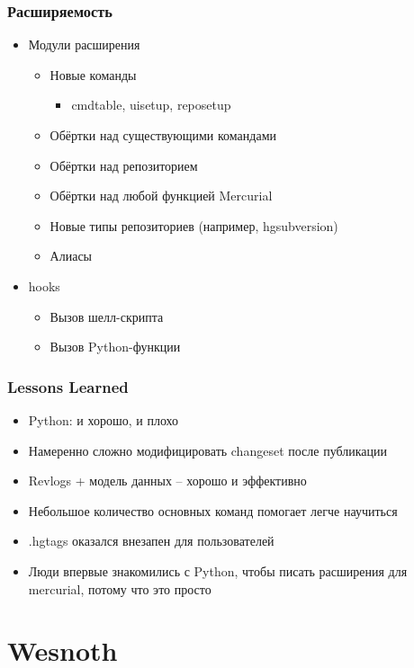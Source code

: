 \documentclass[xetex,mathserif,serif]{beamer}
\begin{document}
	\begin{frame}
		\frametitle{Расширяемость}
		\begin{itemize}
			\item Модули расширения
			\begin{itemize}
				\item Новые команды
				\begin{itemize}
					\item cmdtable, uisetup, reposetup
				\end{itemize}
				\item Обёртки над существующими командами
				\item Обёртки над репозиторием
				\item Обёртки над любой функцией Mercurial
				\item Новые типы репозиториев (например, hgsubversion)
				\item Алиасы
			\end{itemize}
			\item hooks
			\begin{itemize}
				\item Вызов шелл-скрипта
				\item Вызов Python-функции
			\end{itemize}
		\end{itemize}
	\end{frame}

	\begin{frame}
		\frametitle{Lessons Learned}
		\begin{itemize}
			\item Python: и хорошо, и плохо
			\item Намеренно сложно модифицировать changeset после публикации
			\item Revlogs + модель данных -- хорошо и эффективно
			\item Небольшое количество основных команд помогает легче научиться
			\item .hgtags оказался внезапен для пользователей
			\item Люди впервые знакомились с Python, чтобы писать расширения для mercurial, потому что это просто
		\end{itemize}
	\end{frame}

	\section{Wesnoth}
\end{document}
